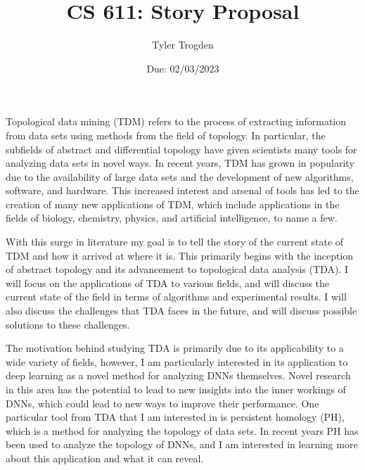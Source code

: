 \documentclass[12pt]{article}
\title{CS 611: Story Proposal}
\author{Tyler Trogden}
\date{Due: 02/03/2023}
\begin{document}
\maketitle

    \section*{}
        Topological data mining (TDM) refers to the process of extracting
        information from data sets using methods from the field of topology.
        In particular, the subfields of abstract and differential topology 
        have given scientists many tools for analyzing data sets in novel ways.
        In recent years, TDM has grown in popularity due to the availability of 
        large data sets and the development of new algorithms, software, and
        hardware. This increased interest and arsenal of tools has
        led to the creation of many new applications of TDM, which include
        applications in the fields of biology, chemistry, physics, and
        artificial intelligence, to name a few.

        With this surge in literature my goal is to tell the story of the
        current state of TDM and how it arrived at where it is. This primarily
        begins with the inception of abstract topology and its advancement to 
        topological data analysis (TDA). I will focus on the applications of 
        TDA to various fields, and will discuss the current state of the 
        field in terms of algorithms and experimental results. I will also 
        discuss the challenges that TDA faces in the future, and will 
        discuss possible solutions to these challenges.

        The motivation behind studying TDA is primarily due to its applicability
        to a wide variety of fields, however, I am particularly interested in its
        application to deep learning as a novel method for analyzing DNNs themselves.
        Novel research in this area has the potential to lead to new insights
        into the inner workings of DNNs, which could lead to new ways to
        improve their performance. One particular tool from TDA that I am
        interested in is persistent homology (PH), which is a method for analyzing
        the topology of data sets. In recent years PH has been used to analyze
        the topology of DNNs, and I am interested in learning more about this
        application and what it can reveal.
\end{document}
